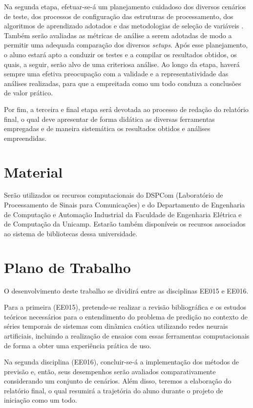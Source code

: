 \documentclass[a4paper, 12pt]{article}
\begin{document}
Na segunda etapa, efetuar-se-á um planejamento cuidadoso dos diversos cenários de teste, dos processos de configuração das estruturas de processamento, dos algoritmos de aprendizado adotados e das metodologias de seleção de variáveis \cite{guyon2003introduction}. Também serão avaliadas as métricas de análise a serem adotadas de modo a permitir uma adequada comparação dos diversos \textit{setups}. Após esse planejamento, o aluno estará apto a conduzir os testes e a compilar os resultados obtidos, os quais, a seguir, serão alvo de uma criteriosa análise. Ao longo da etapa, haverá sempre uma efetiva preocupação com a validade e a representatividade das análises realizadas, para que a empreitada como um todo conduza a conclusões de valor prático.

Por fim, a terceira e final etapa será devotada ao processo de redação do relatório final, o qual deve apresentar de forma didática as diversas ferramentas empregadas e de maneira sistemática os resultados obtidos e análises empreendidas.

\section{Material}

Serão utilizados os recursos computacionais do DSPCom (Laboratório de Processamento de
Sinais para Comunicações) e do Departamento de Engenharia de Computação e Automação Industrial da Faculdade de Engenharia Elétrica e de Computação da Unicamp. Estarão também disponíveis os recursos associados ao sistema de bibliotecas dessa universidade.

\section{Plano de Trabalho}

O desenvolvimento deste trabalho se dividirá entre as disciplinas EE015 e EE016. 

Para a primeira (EE015), pretende-se realizar a revisão bibliográfica e os estudos teóricos necessários para o entendimento do problema de predição no contexto de séries temporais de sistemas com dinâmica caótica utilizando redes neurais artificiais, incluindo a realização de ensaios com essas ferramentas computacionais de forma a obter uma experiência prática de uso.

Na segunda disciplina (EE016), concluir-se-á a implementação dos métodos de previsão e, então, seus desempenhos serão avaliados comparativamente considerando um conjunto de cenários. Além disso, teremos a elaboração do relatório final, o qual resumirá a trajetória do aluno durante o projeto de iniciação como um todo. 
\end{document}
